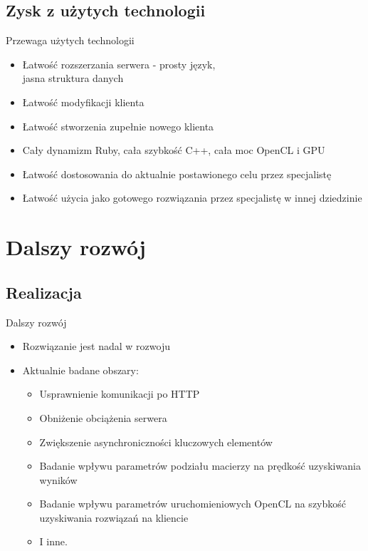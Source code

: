 \documentclass[12pt]{beamer}
\begin{document}
\subsection{Zysk z użytych technologii}
\begin{frame}{Przewaga użytych technologii}
\begin{itemize}
	\item Łatwość rozszerzania serwera - prosty język,\\ jasna struktura danych
	\item Łatwość modyfikacji klienta
	\item Łatwość stworzenia zupełnie nowego klienta
	\item Cały dynamizm Ruby, cała szybkość C++, cała moc OpenCL i GPU
	\item Łatwość dostosowania do aktualnie postawionego celu przez specjalistę
	\item Łatwość użycia jako gotowego rozwiązania przez specjalistę w innej dziedzinie
\end{itemize}
\end{frame}

\section{Dalszy rozwój}
\subsection{Realizacja}
\begin{frame}{Dalszy rozwój}
\begin{itemize}
	\item Rozwiązanie jest nadal w rozwoju
	\item Aktualnie badane obszary:
	\begin{itemize}
		\item Usprawnienie komunikacji po HTTP
		\item Obniżenie obciążenia serwera
		\item Zwiększenie asynchroniczności kluczowych elementów
		\item Badanie wpływu parametrów podziału macierzy na prędkość uzyskiwania wyników
		\item Badanie wpływu parametrów uruchomieniowych OpenCL na szybkość uzyskiwania rozwiązań na kliencie
		\item I inne.
	\end{itemize}
\end{itemize}
\end{frame}
\end{document}
